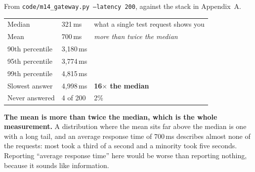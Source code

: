 \begin{measured}
From \texttt{code/m14\_gateway.py --latency 200}, against the stack in
Appendix~A.

\smallskip
\begin{tabular}{@{}L{4.2cm}L{3.0cm}L{6.4cm}@{}}
Median & 321\,ms & what a single test request shows you \\
Mean & 700\,ms & \emph{more than twice the median} \\
90th percentile & 3{,}180\,ms & \\
95th percentile & 3{,}774\,ms & \\
99th percentile & 4{,}815\,ms & \\
Slowest answer & 4{,}998\,ms & \textbf{16$\times$ the median} \\
Never answered & 4 of 200 & 2\% \\
\end{tabular}

\smallskip
\textbf{The mean is more than twice the median, which is the whole
measurement.} A distribution where the mean sits far above the median is one
with a long tail, and an average response time of 700\,ms describes almost none
of the requests: most took a third of a second and a minority took five
seconds. Reporting ``average response time'' here would be worse than reporting
nothing, because it sounds like information.
\end{measured}

